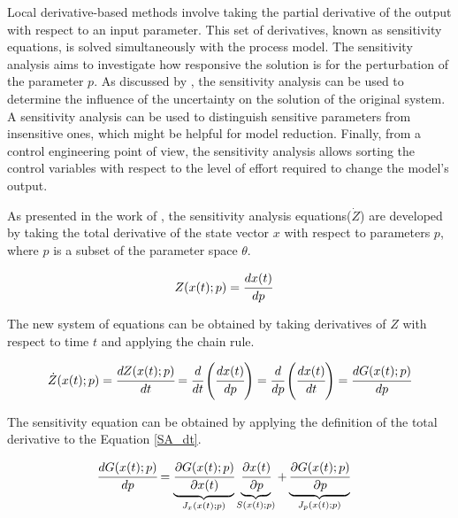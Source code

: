 \documentclass[../Article_Sensitivity_Analsysis.tex]{subfiles}
\begin{document}
	
	Local derivative-based methods involve taking the partial derivative of the output with respect to an input parameter. This set of derivatives, known as sensitivity equations, is solved simultaneously with the process model. The sensitivity analysis aims to investigate how responsive the solution is for the perturbation of the parameter ${p}$. As discussed by \citet{Dickinson1976}, the sensitivity analysis can be used to determine the influence of the uncertainty on the solution of the original system. A sensitivity analysis can be used to distinguish sensitive parameters from insensitive ones, which might be helpful for model reduction. Finally, from a control engineering point of view, the sensitivity analysis allows sorting the control variables with respect to the level of effort required to change the model's output.
	
	As presented in the work of \citet{Maly1996}, the sensitivity analysis equations(${\dot{Z}}$) are developed by taking the total derivative of the state vector $x$ with respect to parameters $p$, where $p$ is a subset of the parameter space $\theta$.
	
	{\footnotesize
		\begin{align}
			{Z}({x}(t);{p}) &= \cfrac{d {x}(t)}{d {p}}
	\end{align} }
	
	The new system of equations can be obtained by taking derivatives of $Z$ with respect to time $t$ and applying the chain rule.
	
	{\footnotesize
		\begin{equation} \label{SA_dt} 
			{\dot{Z}}({x}(t);{p})  = \cfrac{d {Z}(x(t);{p})}{d t} = \cfrac{d}{d t} \left( \cfrac{d {x}(t)}{d {p}} \right) = \cfrac{d }{d {p}} \left( \cfrac{d {x}(t)}{d t} \right) = \cfrac{d {G}({x}(t);{p})}{d {p}} 
	\end{equation} }
	
	The sensitivity equation can be obtained by applying the definition of the total derivative to the Equation \ref{SA_dt}.
	
	{\footnotesize
		\begin{align}		
			\label{SA_eq_full}\cfrac{d {G}({x}(t);{p})}{d {p}} &=  \underbrace{ \cfrac{\partial {G}({x}(t);{p})}{\partial {x}(t)} }_{{J_x}({x}(t);{p})} \underbrace{\cfrac{\partial {x}(t)}{\partial {p}} }_{{S}({x}(t);{p})} + \underbrace{ \cfrac{\partial {G}({x}(t);{p})}{\partial {p}} }_{{J_p}({x}(t);{p})}
	\end{align} }
	
\end{document}
